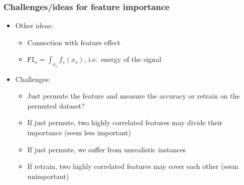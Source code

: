 \begin{frame}
  \frametitle{Challenges/ideas for feature importance}
  \begin{itemize}
    \item Other ideas:
    \begin{itemize}
      \item Connection with feature effect
      \item $\mathtt{FI}_s = \int_{x_s} f_s(x_s)$, i.e.~energy of the signal
    \end{itemize}
    \item Challenges:
    \begin{itemize}
      \item Just permute the feature and measure the accuracy or retrain on the permuted dataset?
      \item If just permute, two highly correlated features may divide their importance (seem less important)
      \item If just permute, we suffer from unrealistic instances
      \item If retrain, two highly correlated features may cover each other (seem unimportant)
    \end{itemize}
  \end{itemize}
\end{frame}



